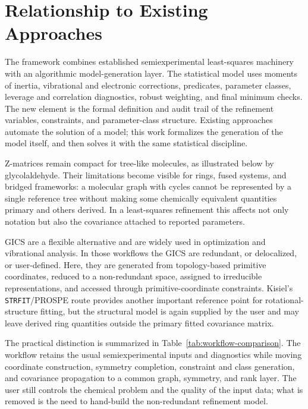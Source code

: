 \documentclass[aip,jcp,reprint,longbibliography,floatfix]{revtex4-2}
\begin{document}
\section{Relationship to Existing Approaches}

The framework combines established semiexperimental least-squares
machinery\cite{Mendolicchio2017MSR,Bartell1975Predicate,Mendolicchio2025FastDvib}
with an algorithmic model-generation layer. The statistical model
uses moments of inertia, vibrational and electronic corrections, predicates,
parameter classes, leverage and correlation diagnostics, robust weighting, and
final minimum checks. The new element is the formal definition and audit
trail of the refinement variables, constraints, and parameter-class structure.
Existing approaches automate the solution of a model; this work formalizes
the generation of the model itself, and then solves it with the same
statistical discipline.

Z-matrices remain compact for tree-like molecules, as illustrated below by
glycolaldehyde. Their limitations become visible for rings, fused systems, and
bridged frameworks: a molecular graph with cycles cannot be represented by a
single reference tree without making some chemically equivalent quantities
primary and others derived. In a least-squares refinement this affects not
only notation but also the covariance attached to reported parameters.

GICS are a flexible alternative and are widely used in optimization and vibrational analysis.\cite{Wilson1955,PulayFogarasi1992,Peng1996Redundant,Baker1996Delocalized,BakkenHelgaker2002,Marenich2025GIC} In those workflows the GICS are redundant, or delocalized, or user-defined.
Here, they are generated from topology-based primitive coordinates,
reduced to a non-redundant space, assigned to irreducible representations, and
accessed through primitive-coordinate constraints. Kisiel's
\texttt{STRFIT}/PROSPE route\cite{KisielPROSPE} provides another important
reference point for rotational-structure fitting, but the structural model is
again supplied by the user and may leave derived ring quantities outside the
primary fitted covariance matrix.\cite{Kanzow2025PCCP}

The practical distinction is summarized in Table~\ref{tab:workflow-comparison}.
The workflow retains the usual semiexperimental inputs and diagnostics while
moving coordinate construction, symmetry completion, constraint and class
generation, and covariance propagation to a common graph, symmetry, and rank
layer. The
user still controls the chemical problem and the quality of the input data;
what is removed is the need to hand-build the non-redundant refinement model.
\end{document}
